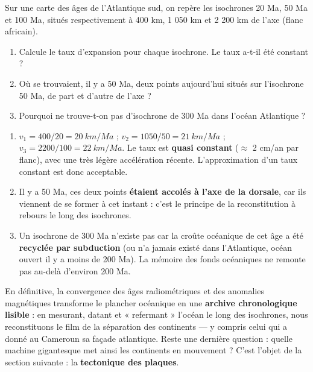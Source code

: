 \documentclass[11pt]{article}
\begin{document}
\begin{exercice}
Sur une carte des âges de l'Atlantique sud, on repère les isochrones 20 Ma, 50 Ma et 100 Ma, situés respectivement à 400 km, 1 050 km et 2 200 km de l'axe (flanc africain).
\begin{enumerate}
\item Calcule le taux d'expansion pour chaque isochrone. Le taux a-t-il été constant ?
\item Où se trouvaient, il y a 50 Ma, deux points aujourd'hui situés sur l'isochrone 50 Ma, de part et d'autre de l'axe ?
\item Pourquoi ne trouve-t-on pas d'isochrone de 300 Ma dans l'océan Atlantique ?
\end{enumerate}
\end{exercice}

\begin{corrige}
\begin{enumerate}
\item $v_1 = 400/20 = \SI{20}{km/Ma}$ ; $v_2 = 1050/50 = \SI{21}{km/Ma}$ ; $v_3 = 2200/100 = \SI{22}{km/Ma}$. Le taux est \textbf{quasi constant} ($\approx$ 2 cm/an par flanc), avec une très légère accélération récente. L'approximation d'un taux constant est donc acceptable.
\item Il y a 50 Ma, ces deux points \textbf{étaient accolés à l'axe de la dorsale}, car ils viennent de se former à cet instant : c'est le principe de la reconstitution à rebours le long des isochrones.
\item Un isochrone de 300 Ma n'existe pas car la croûte océanique de cet âge a été \textbf{recyclée par subduction} (ou n'a jamais existé dans l'Atlantique, océan ouvert il y a moins de 200 Ma). La mémoire des fonds océaniques ne remonte pas au-delà d'environ 200 Ma.
\end{enumerate}
\end{corrige}

En définitive, la convergence des âges radiométriques et des anomalies magnétiques transforme le plancher océanique en une \textbf{archive chronologique lisible} : en mesurant, datant et « refermant » l'océan le long des isochrones, nous reconstituons le film de la séparation des continents — y compris celui qui a donné au Cameroun sa façade atlantique. Reste une dernière question : quelle machine gigantesque met ainsi les continents en mouvement ? C'est l'objet de la section suivante : la \textbf{tectonique des plaques}.
\end{document}
